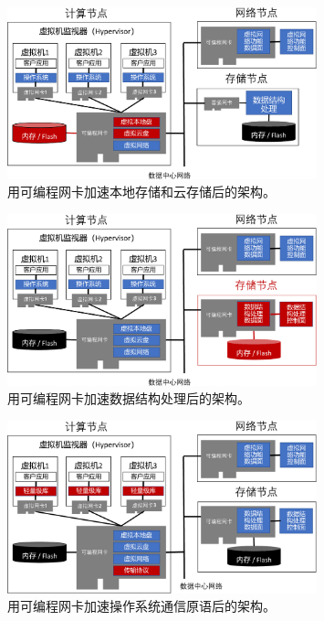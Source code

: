 \begin{figure}[htbp]
	\centering
	\includegraphics[width=0.8\textwidth]{figures/virt_storage.pdf}
	\caption{用可编程网卡加速本地存储和云存储后的架构。}
	\label{arch:fig:virt-storage}
\end{figure}

\begin{figure}[htbp]
	\centering
	\includegraphics[width=0.8\textwidth]{figures/data_structure_accel.pdf}
	\caption{用可编程网卡加速数据结构处理后的架构。}
	\label{arch:fig:data-structure-accel}
\end{figure}


\begin{figure}[htbp]
	\centering
	\includegraphics[width=0.8\textwidth]{figures/os_primitives_accel.pdf}
	\caption{用可编程网卡加速操作系统通信原语后的架构。}
	\label{arch:fig:os-primitives-accel}
\end{figure}



